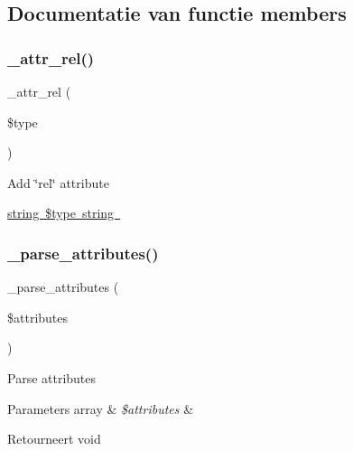 \subsection{Documentatie van functie members}
\mbox{\label{class_c_i___pagination_a0ebda639ff890a52b36ca5eaf27275c0}} 
\subsubsection{\texorpdfstring{\_attr\_rel()}{\_attr\_rel()}}
{\footnotesize\ttfamily \+\_\+attr\+\_\+rel (\begin{DoxyParamCaption}\item[{}]{\$type }\end{DoxyParamCaption})\hspace{0.3cm}{\ttfamily [protected]}}

Add \char`\"{}rel\char`\"{} attribute

\mbox{\hyperlink{}{string \$type  string }}\mbox{\label{class_c_i___pagination_ac8d823533e1a045a789a197373fedf0b}} 
\subsubsection{\texorpdfstring{\_parse\_attributes()}{\_parse\_attributes()}}
{\footnotesize\ttfamily \+\_\+parse\+\_\+attributes (\begin{DoxyParamCaption}\item[{}]{\$attributes }\end{DoxyParamCaption})\hspace{0.3cm}{\ttfamily [protected]}}

Parse attributes


\begin{DoxyParams}[1]{Parameters}
array & {\em \$attributes} & \\
\hline
\end{DoxyParams}
\begin{DoxyReturn}{Retourneert}
void 
\end{DoxyReturn}
\mbox{\label{class_c_i___pagination_afd580f4d296b1d416d2b4b03edef3bc5}} 
